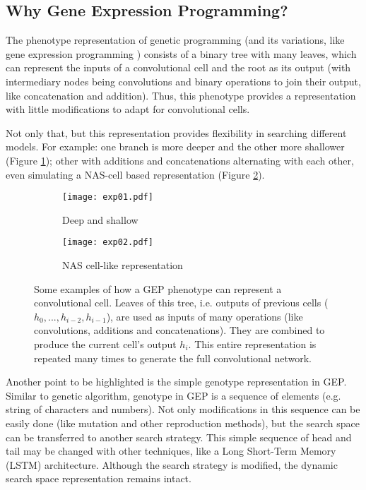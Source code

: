 \documentclass[conference]{IEEEtran}
\begin{document}
	\subsection{Why Gene Expression Programming?}
	
	The phenotype representation of genetic programming (and its variations, like gene expression programming \cite{ferreira2001gene}) consists of a binary tree with many leaves, which can represent the inputs of a convolutional cell and the root as its output (with intermediary nodes being convolutions and binary operations to join their output, like concatenation and addition).
	Thus, this phenotype provides a representation with little modifications to adapt for convolutional cells.
	
	Not only that, but this representation provides flexibility in searching different models.    
	For example: one branch is more deeper and the other more shallower (Figure \ref{fig:example1}); other with additions and concatenations alternating with each other, even simulating a NAS-cell based representation (Figure \ref{fig:example2}).
	
	\begin{figure}[htb]
		\centering
		\hfill
		\begin{subfigure}[b]{0.17\textwidth}
			\centering
			\texttt{[image: exp01.pdf]}			
			\caption{Deep and shallow}
			\label{fig:example1}
		\end{subfigure}
		\hfill
		\begin{subfigure}[b]{0.3\textwidth}
			\centering
			\texttt{[image: exp02.pdf]}
			\caption{NAS cell-like representation}
			\label{fig:example2}
		\end{subfigure}
		\hfill
		\caption{Some examples of how a GEP phenotype can represent a convolutional cell. Leaves of this tree, i.e. outputs of previous cells ($h_{0}, ..., h_{i-2}, h_{i-1}$), are used as inputs of many operations (like convolutions, additions and concatenations). They are combined to produce the current cell's output $h_i$. This entire representation is repeated many times to generate the full convolutional network.}
		\label{fig:examples}
	\end{figure}
	
	Another point to be highlighted is the simple genotype representation in GEP. 
	Similar to genetic algorithm, genotype in GEP is a sequence of elements (e.g. string of characters and numbers).
	Not only modifications in this sequence can be easily done (like mutation and other reproduction methods), but the search space can be transferred to another search strategy.
	This simple sequence of head and tail may be changed with other techniques, like a Long Short-Term Memory (LSTM) architecture.
	Although the search strategy is modified, the dynamic search space representation remains intact.
	
\end{document}
